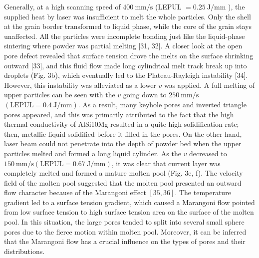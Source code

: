 \documentclass[10pt]{article}
\begin{document}
Generally, at a high scanning speed of $400 \mathrm{~mm} / \mathrm{s}$ (LEPUL $=0.25 \mathrm{~J} / \mathrm{mm}$ ), the supplied heat by laser was insufficient to melt the whole particles. Only the shell at the grain border transformed to liquid phase, while the core of the grain stays unaffected. All the particles were incomplete bonding just like the liquid-phase sintering where powder was partial melting [31, 32]. A closer look at the open pore defect revealed that surface tension drove the melts on the surface shrinking outward [33], and this fluid flow made long cylindrical melt track break up into droplets (Fig. 3b), which eventually led to the Plateau-Rayleigh instability [34]. However, this instability was alleviated as a lower $v$ was applied. A full melting of upper particles can be seen with the $v$ going down to $250 \mathrm{~mm} / \mathrm{s}$ $(\mathrm{LEPUL}=0.4 \mathrm{~J} / \mathrm{mm})$. As a result, many keyhole pores and inverted triangle pores appeared, and this was primarily attributed to the fact that the high thermal conductivity of AlSi10Mg resulted in a quite high solidification rate; then, metallic liquid solidified before it filled in the pores. On the other hand, laser beam could not penetrate into the depth of powder bed when the upper particles melted and formed a long liquid cylinder. As the $v$ decreased to $150 \mathrm{~mm} / \mathrm{s}(\mathrm{LEPUL}=0.67 \mathrm{~J} / \mathrm{mm})$, it was clear that current layer was completely melted and formed a mature molten pool (Fig. 3e, f). The velocity field of the molten pool suggested that the molten pool presented an outward flow character because of the Marangoni effect $[35,36]$. The temperature gradient led to a surface tension gradient, which caused a Marangoni flow pointed from low surface tension to high surface tension area on the surface of the molten pool. In this situation, the large pores tended to split into several small sphere pores due to the fierce motion within molten pool. Moreover, it can be inferred that the Marangoni flow has a crucial influence on the types of pores and their distributions.
\end{document}
